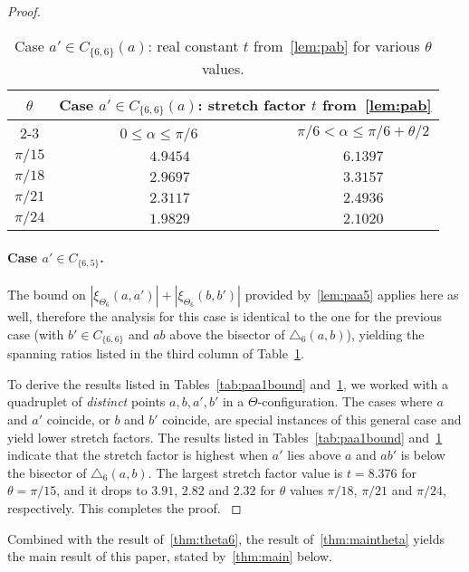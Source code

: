 \documentclass[runningheads,a4paper]{llncs}
\newcommand{\ABox}{
\raisebox{3pt}{\framebox[6pt]{\rule{6pt}{0pt}}}
}
\newcommand{\pp}{\xi}
\begin{document}
\begin{proof}
\begin{table}[hptb]
\begin{center}
\begin{tabular} {|c|c|c|}
\hline
\multirow{3}{*}{$\theta$} & \multicolumn{2}{|c|}{Case $a' \in C_{\{6,6\}}(a)$: stretch factor $t$ from~\autoref{lem:pab}} \\
\cline{2-3}
& ~~~~~~~~$0 \le \alpha \le \pi/6$~~~~~~~~~~~ & $\pi/6 < \alpha \le \pi/6+\theta/2$ \\
\hline
$\pi/15$ & $4.9454$ & $6.1397$ \\
$\pi/18$ & $2.9697$ & $3.3157$ \\
$\pi/21$ & $2.3117$ & $2.4936$ \\
$\pi/24$ & $1.9829$ & $2.1020$ \\
\hline
\end{tabular}
\end{center}
\caption{Case $a' \in C_{\{6,6\}}(a)$: real constant $t$ from~\autoref{lem:pab} for various $\theta$ values.}
\label{tab:paa2bound}
\end{table}
\paragraph{Case $a' \in C_{\{6,5\}}$.} The bound on $|\pp_{\Theta_6}(a, a')| + |\pp_{\Theta_6}(b, b')|$ provided by~\autoref{lem:paa5} applies here as well, therefore the analysis for this case is identical to the one for the previous case (with $b' \in C_{\{6,6\}}$ and $ab$ above the bisector of $\triangle_6(a, b)$), yielding the spanning ratios listed in the third column of Table~\ref{tab:paa2bound}. 

To derive the results listed in Tables~\ref{tab:paa1bound} and~\ref{tab:paa2bound}, we worked with a quadruplet of \emph{distinct} points $a,b,a',b'$ in a  $\Theta$-configuration. The cases where $a$ and $a'$ coincide, or $b$ and $b'$ coincide, are special instances of this general case and yield lower stretch factors. 
The results listed in Tables~\ref{tab:paa1bound} and~\ref{tab:paa2bound} 
indicate that the stretch factor is highest when $a'$ lies above $a$ and $ab'$ is below the bisector of $\triangle_6(a,b)$. The largest stretch factor value is $t = 8.376$ for $\theta = \pi/15$, and it drops to $3.91$, $2.82$ and $2.32$ for $\theta$ values 
$\pi/18$, $\pi/21$ and $\pi/24$, respectively. This completes the proof.
{\hfill\ABox}\end{proof}
Combined with the result of~\autoref{thm:theta6}, the result of~\autoref{thm:maintheta} yields the main result of this paper, stated by~\autoref{thm:main} below. 
\end{document}
